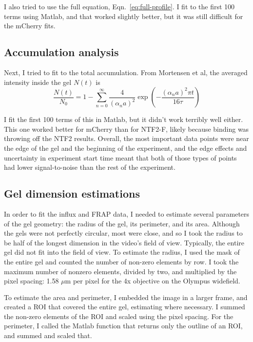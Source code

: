 I also tried to use the full equation, Eqn.~\ref{eq:full-profile}.  I fit to the first 100 terms using Matlab, and that worked slightly better, but it was still difficult for the mCherry fits.
\subsection{Accumulation analysis}
Next, I tried to fit to the total accumulation.  From Mortensen et al, the averaged intensity inside the gel $N(t)$ is
\begin{equation}
\frac{N(t)}{N_0} = 1-\sum_{n=0}^\infty \frac{4}{(\alpha_na)^2}\exp\left(-\frac{(\alpha_na)^2\pi t}{16\tau}\right)
\label{eq:full-accumulation}
\end{equation}

I fit the first 100 terms of this in Matlab, but it didn't work terribly well either.  This one worked better for mCherry than for NTF2-F, likely because binding was throwing off the NTF2 results.  Overall, the most important data points were near the edge of the gel and the beginning of the experiment, and the edge effects and uncertainty in experiment start time meant that both of those types of points had lower signal-to-noise than the rest of the experiment.

\subsection{Gel dimension estimations}
In order to fit the influx and FRAP data, I needed to estimate several parameters of the gel geometry: the radius of the gel, its perimeter, and its area.  Although the gels were not perfectly circular, most were close, and so I took the radius to be half of the longest dimension in the video's field of view.  Typically, the entire gel did not fit into the field of view.   To estimate the radius, I used the mask of the entire gel and counted the number of non-zero elements by row.  I took the maximum number of nonzero elements, divided by two, and multiplied by the pixel spacing: 1.58 $\mu$m per pixel for the 4x objective on the Olympus widefield.

To estimate the area and perimeter, I embedded the image in a larger frame, and created a ROI that covered the entire gel, estimating where necessary.  I summed the non-zero elements of the ROI and scaled using the pixel spacing.  For the perimeter, I called the Matlab function that returns only the outline of an ROI, and summed and scaled that.

